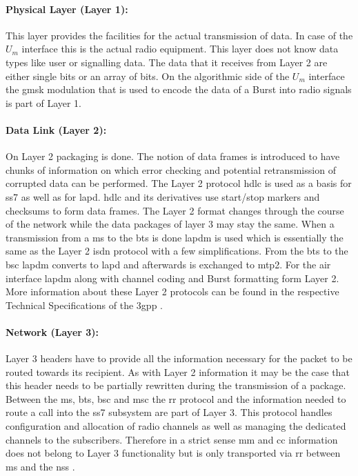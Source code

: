 \paragraph{Physical Layer (Layer 1):} This layer provides the facilities for the actual transmission of data.
In case of the $U_m$ interface this is the actual radio equipment.
This layer does not know data types like user or signalling data.
The data that it receives from Layer 2 are either single bits or an array of bits.
On the algorithmic side of the $U_m$ interface the \gls{gmsk} modulation that is used to encode the data of a Burst into radio signals is part of Layer 1.

\paragraph{Data Link (Layer 2):} On Layer 2 packaging is done.
The notion of data frames is introduced to have chunks of information on which error checking and potential retransmission of corrupted data can be performed.
The Layer 2 protocol \gls{hdlc} is used as a basis for \gls{ss7} as well as for \gls{lapd}.
\gls{hdlc} and its derivatives use start/stop markers and checksums to form data frames.
The Layer 2 format changes through the course of the network while the data packages of layer 3 may stay the same.
When a transmission from a \gls{ms} to the \gls{bts} is done \gls{lapdm} is used which is essentially the same as the Layer 2 \gls{isdn} protocol with a few simplifications.
From the \gls{bts} to the \gls{bsc} \gls{lapdm} converts to \gls{lapd} and afterwards is exchanged to \gls{mtp2}.
For the air interface \gls{lapdm} along with channel coding and Burst formatting form Layer 2.
More information about these Layer 2 protocols can be found in the respective Technical Specifications of the \gls{3gpp} \cite{GSM0405,GSM0406}.

\paragraph{Network (Layer 3):} Layer 3 headers have to provide all the information necessary for the packet to be routed towards its recipient.
As with Layer 2 information it may be the case that this header needs to be partially rewritten during the transmission of a package.
Between the \gls{ms}, \gls{bts}, \gls{bsc} and \gls{msc} the \gls{rr} protocol and the information needed to route a call into the \gls{ss7} subsystem are part of Layer 3.
This protocol handles configuration and allocation of radio channels as well as managing the dedicated channels to the subscribers.
Therefore in a strict sense \gls{mm} and \gls{cc} information does not belong to Layer 3 functionality but is only transported via \gls{rr} between \gls{ms} and the \gls{nss} \cite{protocols1999}.

